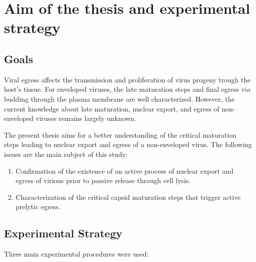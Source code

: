 
\chapter{Aim of the thesis and experimental strategy} %

\label{Aim} 


\graphicspath{{./Pictures/}}


\section{Goals}

Viral egress affects the transmission and proliferation of virus progeny trough the host's tissue. For enveloped viruses, the late maturation steps and final egress via budding through the plasma membrane are well characterized. However, the current knowledge about late maturation, nuclear export, and egress of non-enveloped viruses remains largely unknown. 

The present thesis aims for a better understanding of the critical maturation steps leading to nuclear export and egress of a non-enveloped virus. The following issues are the main subject of this study: 




\medskip

\begin{enumerate}
\item Confirmation of the existence of an active process of nuclear export and egress of virions prior to passive release through cell lysis. 
\item Characterization of the critical capsid maturation steps that trigger active prelytic egress.
\end{enumerate}

\bigskip
\bigskip

\section{Experimental Strategy}

Three main experimental procedures were used:

\medskip

